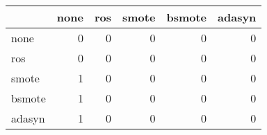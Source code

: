 \begin{tabular}{lrrrrr}
\hline
        &   none &   ros &   smote &   bsmote &   adasyn \\
\hline
 none   &      0 &     0 &       0 &        0 &        0 \\
 ros    &      0 &     0 &       0 &        0 &        0 \\
 smote  &      1 &     0 &       0 &        0 &        0 \\
 bsmote &      1 &     0 &       0 &        0 &        0 \\
 adasyn &      1 &     0 &       0 &        0 &        0 \\
\hline
\end{tabular}